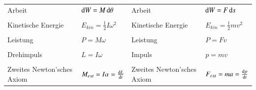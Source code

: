 \begin{center}
\begin{adjustbox}{angle=90}
\begin{tabular}{llll}
					Arbeit						& $ \mathop{} \! \mathrm{d} W = M \mathop{} \! \mathrm{d} \theta $ & Arbeit															& $ \mathop{} \! \mathrm{d} W = F \mathop{} \! \mathrm{d} s $ \\
					&&&\\
					Kinetische Energie			& $ E_{kin} = \frac{1}{2} I \omega^2 $ & Kinetische Energie										& $ E_{kin} = \frac{1}{2}mv^2 $ \\
					&&&\\
					Leistung					& $ P = M \omega $ & Leistung																	& $ P = Fv $ \\
					&&&\\
					Drehimpuls					& $ L = I \omega $ & Impuls																		& $ p = mv $ \\
					&&&\\
					Zweites Newton'sches Axiom 	& $ M_{ext} = I \alpha = \frac{\mathop{} \! \mathrm{d} L}{\mathop{} \! \mathrm{d} t} $ & Zweites Newton'sches Axiom					& $ F_{ext} = m a = \frac{\mathop{} \! \mathrm{d} p}{\mathop{} \! \mathrm{d} t} $ \\
				\end{tabular}
			\end{adjustbox}
		\end{center}

		
